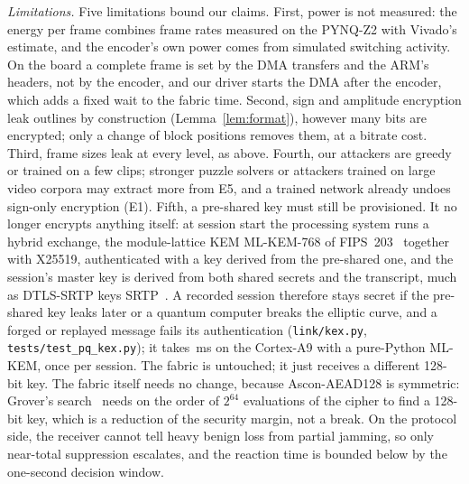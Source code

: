 \textit{Limitations.} Five limitations bound our claims. First, power is not measured: the energy per frame combines frame rates measured on the PYNQ-Z2 with Vivado's estimate, and the encoder's own power comes from simulated switching activity. On the board a complete frame is set by the DMA transfers and the ARM's headers, not by the encoder, and our driver starts the DMA after the encoder, which adds a fixed wait to the fabric time. Second, sign and amplitude encryption leak outlines by construction (Lemma~\ref{lem:format}), however many bits are encrypted; only a change of block positions removes them, at a bitrate cost. Third, frame sizes leak at every level, as above. Fourth, our attackers are greedy or trained on a few clips; stronger puzzle solvers or attackers trained on large video corpora may extract more from E5, and a trained network already undoes sign-only encryption (E1). Fifth, a pre-shared key must still be provisioned. It no longer encrypts anything itself: at session start the processing system runs a hybrid exchange, the module-lattice KEM ML-KEM-768 of FIPS~203~\cite{fips203} together with X25519, authenticated with a key derived from the pre-shared one, and the session's master key is derived from both shared secrets and the transcript, much as DTLS-SRTP keys SRTP~\cite{rfc3711}. A recorded session therefore stays secret if the pre-shared key leaks later or a quantum computer breaks the elliptic curve, and a forged or replayed message fails its authentication (\texttt{link/kex.py}, \texttt{tests/test\_pq\_kex.py}); it takes \BdKexMs\,ms on the Cortex-A9 with a pure-Python ML-KEM, once per session. The fabric is untouched; it just receives a different 128-bit key. The fabric itself needs no change, because Ascon-AEAD128 is symmetric: Grover's search~\cite{grover1996} needs on the order of $2^{64}$ evaluations of the cipher to find a 128-bit key, which is a reduction of the security margin, not a break. On the protocol side, the receiver cannot tell heavy benign loss from partial jamming, so only near-total suppression escalates, and the reaction time is bounded below by the one-second decision window.

